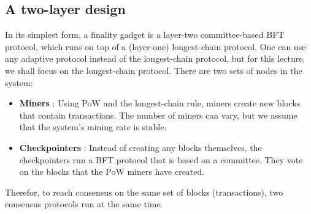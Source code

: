 \documentclass{report}
\begin{document}
{\subsection{A two-layer design}
In its simplest form, a finality gadget is a layer-two committee-based BFT protocol, which runs on top of a (layer-one) longest-chain protocol. One can use any adaptive protocol instead of the longest-chain protocol, but for this lecture, we shall focus on the longest-chain protocol. There are two sets of nodes in the system:
\begin{itemize}
	\item \textbf{Miners} : Using PoW and the longest-chain rule, miners create new blocks that contain transactions. The number of miners can vary, but we assume that the system’s mining rate is stable.
	\item \textbf{Checkpointers} : Instead of creating any blocks themselves, the checkpointers run a BFT protocol that is based on a committee. They vote on the blocks that the PoW miners have created.
\end{itemize}
Therefor, to reach consensus on the same set of blocks (transactions), two consensus protocols run at the same time.
}
\end{document}

